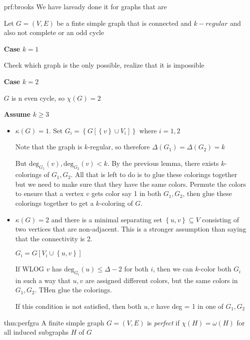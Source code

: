 \begin{prf}[Brooks]{prf:brooks}
  We have laready done it for graphs that are \par
  \noindent Let $G = (V,E)$ be a finte simple graph that is connected and $k-regular$ and also not complete or an odd cycle
  \par\bigskip
  \noindent\textbf{Case $k=1$}\par
  Check which graph is the only possible, realize that it is impossible
  \par\bigskip
  \noindent\textbf{Case $k=2$}\par
  $G$ is n even cycle, so $\chi(G) = 2$
  \par\bigskip
  \noindent\textbf{Assume $k\geq3$}\par
  \begin{itemize}
  \item$\kappa(G) = 1$. Set $G_i = \left\{G[\left\{v\right\}\cup V_i]\right\}$ where $i=1,2$
    \par\bigskip
    \noindent Note that the graph is $k$-regular, so therefore $\Delta(G_1) = \Delta(G_2) = k$
    \par\bigskip
    \noindent But $\text{deg}_{G_1}(v),\text{deg}_{G_2}(v)<k$. By the previous lemma, there exists $k$-colorings of $G_1,G_2$. All that is left to do is to glue these colorings together but we need to make sure that they have the same colors. Permute the colors to ensure that a vertex $v$ gets color say 1 in both $G_1,G_2$, then glue these colorings together to get a $k$-coloring of $G$.
    \par\bigskip
  \item$\kappa(G) = 2$ and there is a minimal separating set $\left\{u,v\right\}\subseteq V$ consisting of two vertices that are non-adjacent. This is a stronger assumption than saying that the connectivity is 2.\par
    $G_i = G[V_i\cup\left\{u,v\right\}]$\par
    If WLOG $v$ has $\text{deg}_{G_i}(u)\leq\Delta-2$ for both $i$, then we can $k$-color both $G_i$ in such a way that $u,v$ are assigned different colors, but the same colors in $G_1,G_2$. THen glue the colorings.
    \par\bigskip
    If this condition is not satisfied, then both $u,v$ have deg = 1 in one of $G_1,G_2$
  \end{itemize}
\end{prf}
\par\bigskip
\begin{theo}{thm:perfgra}
  A finite simple graph $G = (V,E)$  is \textit{perfect} if $\chi(H) = \omega(H)$ for all induced subgraphs $H$ of $G$
\end{theo}
